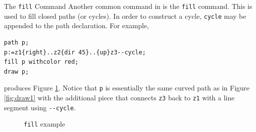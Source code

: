 \begin{subsection}{The \texttt{fill} Command}
Another common command in \MP{} is the \texttt{fill} command.  This is used to fill closed paths (or cycles).  In order to construct a cycle, \texttt{cycle} may be appended to the path declaration.  For example,
\begin{lstlisting}[xleftmargin=7bp]
path p;
p:=z1{right}..z2{dir 45}..{up}z3--cycle;
fill p withcolor red;
draw p;
\end{lstlisting}
produces Figure \ref{fig:fill}.  Notice that \texttt{p} is essentially the same curved path as in Figure \ref{fig:draw1} with the additional piece that connects \texttt{z3} back to \texttt{z1} with a line segment using \texttt{-{}-cycle}.
\begin{figure}[t]
	\begin{center}\end{center}
	\caption{\texttt{fill} example}\label{fig:fill}
\end{figure}


\end{subsection}
